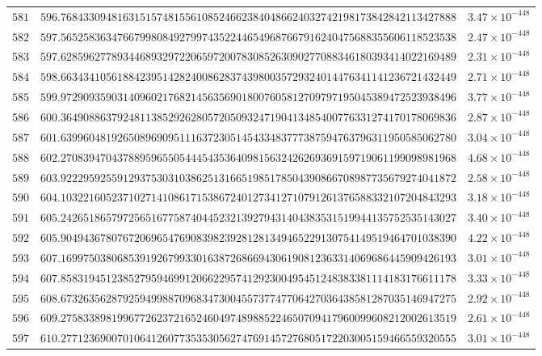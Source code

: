 \documentclass[12pt,reqno]{amsart}
\theoremstyle{remark}
\begin{document}
\begin{longtable}{clc}
$581$ & $596.7684330948163151574815561085246623840486624032742198173842842113427888$ & $3.47\times 10^{-448}$ \\
$582$ & $597.5652583634766799808492799743522446549687667916240475688355606118523538$ & $2.47\times 10^{-448}$ \\
$583$ & $597.6285962778934468932972206597200783085263090277088346180393414022169489$ & $2.31\times 10^{-448}$ \\
$584$ & $598.6634341056188423951428240086283743980035729324014476341141236721432449$ & $2.71\times 10^{-448}$ \\
$585$ & $599.9729093590314096021768214563569018007605812709797195045389472523938496$ & $3.77\times 10^{-448}$ \\
$586$ & $600.3649088637924811385292628057205093247190413485400776331274170178069836$ & $2.87\times 10^{-448}$ \\
$587$ & $601.6399604819265089690951116372305145433483777387594763796311950585062780$ & $3.04\times 10^{-448}$ \\
$588$ & $602.2708394704378895965505444543536409815632426269369159719061199098981968$ & $4.68\times 10^{-448}$ \\
$589$ & $603.9222959255912937530310386251316651985178504390866708987735679274041872$ & $2.58\times 10^{-448}$ \\
$590$ & $604.1032216052371027141086171538672401273412710791261376588332107204843293$ & $3.18\times 10^{-448}$ \\
$591$ & $605.2426518657972565167758740445232139279431404383531519944135752535143027$ & $3.40\times 10^{-448}$ \\
$592$ & $605.9049436780767206965476908398239281281349465229130754149519464701038390$ & $4.22\times 10^{-448}$ \\
$593$ & $607.1699750380685391926799330163872686694306190812363314069686445909426193$ & $3.01\times 10^{-448}$ \\
$594$ & $607.8583194512385279594699120662295741292300495451248383381114183176611178$ & $3.33\times 10^{-448}$ \\
$595$ & $608.6732635628792594998870968347300455737747706427036438581287035146947275$ & $2.92\times 10^{-448}$ \\
$596$ & $609.2758338981996772623721652460497489885224650709417960099608212002613519$ & $2.61\times 10^{-448}$ \\
$597$ & $610.2771236900701064126077353530562747691457276805172203005159466559320555$ & $3.01\times 10^{-448}$ \\

\end{longtable}
\end{document}
